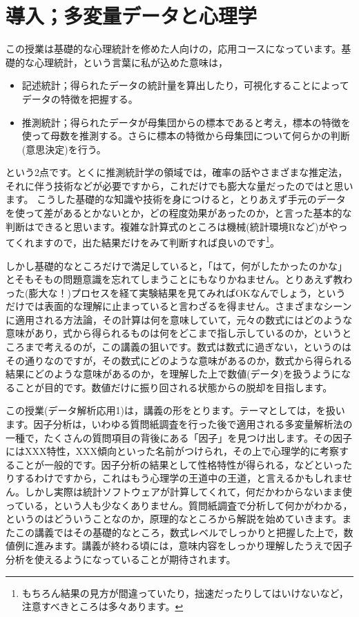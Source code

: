 \documentclass{ltjsbook}
\begin{document}
\chapter{導入；多変量データと心理学}
\label{x01_introduction}

この授業は基礎的な心理統計を修めた人向けの，応用コースになっています。基礎的な心理統計，という言葉に私が込めた意味は，
\begin{itemize}
	\item 記述統計；得られたデータの統計量を算出したり，可視化することによってデータの特徴を把握する。
	\item 推測統計；得られたデータが母集団からの標本であると考え，標本の特徴を使って母数を推測する。さらに標本の特徴から母集団について何らかの判断(意思決定)を行う。
\end{itemize}
という2点です。とくに推測統計学の領域では，確率の話やさまざまな推定法，それに伴う技術などが必要ですから，これだけでも膨大な量だったのではと思います。
こうした基礎的な知識や技術を身につけると，とりあえず手元のデータを使って差があるとかないとか，どの程度効果があったのか，と言った基本的な判断はできると思います。複雑な計算式のところは機械(統計環境Rなど)がやってくれますので，出た結果だけをみて判断すれば良いのです\footnote{もちろん結果の見方が間違っていたり，拙速だったりしてはいけないなど，注意すべきところは多々あります。}。

しかし基礎的なところだけで満足していると，「はて，何がしたかったのかな」とそもそもの問題意識を忘れてしまうことにもなりかねません。とりあえず教わった(膨大な！)プロセスを経て実験結果を見てみればOKなんでしょう，というだけでは表面的な理解に止まっていると言わざるを得ません。さまざまなシーンに適用される方法論，その計算は何を意味していて，元々の数式にはどのような意味があり，式から得られるものは何をどこまで指し示しているのか，というところまで考えるのが，この講義の狙いです。数式は数式に過ぎない，というのはその通りなのですが，その数式にどのような意味があるのか，数式から得られる結果にどのような意味があるのか，を理解した上で数値(データ)を扱うようになることが目的です。数値だけに振り回される状態からの脱却を目指します。

この授業(データ解析応用1)は，講義の形をとります。テーマとしては，を扱います。因子分析は，いわゆる質問紙調査を行った後で適用される多変量解析法の一種で，たくさんの質問項目の背後にある「因子」を見つけ出します。その因子にはXXX特性，XXX傾向といった名前がつけられ，その上で心理学的に考察することが一般的です。因子分析の結果として性格特性が得られる，などといったりするわけですから，これはもう心理学の王道中の王道，と言えるかもしれません。しかし実際は統計ソフトウェアが計算してくれて，何だかわからないまま使っている，という人も少なくありません。質問紙調査で分析して何かがわかる，というのはどういうことなのか，原理的なところから解説を始めていきます。またこの講義ではその基礎的なところ，数式レベルでしっかりと把握した上で，数値例に進みます。講義が終わる頃には，意味内容をしっかり理解したうえで因子分析を使えるようになっていることが期待されます。
\end{document}
